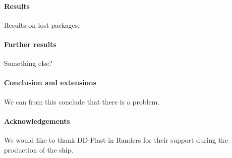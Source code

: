 \documentclass[a0,portrait]{a0poster}
\begin{document}
\begin{center}
{\paragraph{Results}
Results on lost packages. 
\paragraph{Further results}
Something else?
\paragraph{Conclusion and extensions}
We can from this conclude that there is a problem.
\paragraph{Acknowledgements} We would like to thank DD-Plast in Randers for their support during the production of the ship.


}
\end{center}


\makefooter
\end{document}
